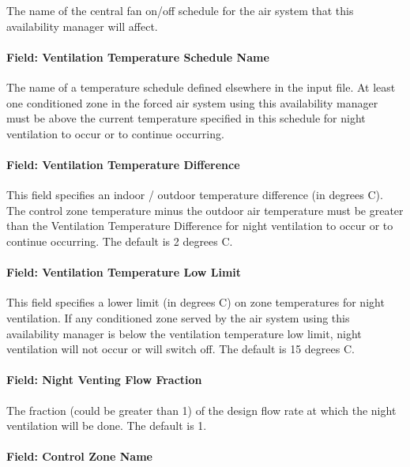 The name of the central fan on/off schedule for the air system that this availability manager will affect.

\paragraph{Field: Ventilation Temperature Schedule Name}\label{field-ventilation-temperature-schedule-name}

The name of a temperature schedule defined elsewhere in the input file. At least one conditioned zone in the forced air system using this availability manager must be above the current temperature specified in this schedule for night ventilation to occur or to continue occurring.

\paragraph{Field: Ventilation Temperature Difference}\label{field-ventilation-temperature-difference}

This field specifies an indoor / outdoor temperature difference (in degrees C). The control zone temperature minus the outdoor air temperature must be greater than the Ventilation Temperature Difference for night ventilation to occur or to continue occurring. The default is 2 degrees C.

\paragraph{Field: Ventilation Temperature Low Limit}\label{field-ventilation-temperature-low-limit}

This field specifies a lower limit (in degrees C) on zone temperatures for night ventilation. If any conditioned zone served by the air system using this availability manager is below the ventilation temperature low limit, night ventilation will not occur or will switch off. The default is 15 degrees C.

\paragraph{Field: Night Venting Flow Fraction}\label{field-night-venting-flow-fraction}

The fraction (could be greater than 1) of the design flow rate at which the night ventilation will be done. The default is 1.

\paragraph{Field: Control Zone Name}\label{field-control-zone-name-000}

